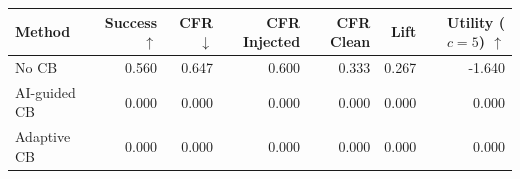 \begin{tabular}{lrrrrrr}
\toprule
Method & Success $\uparrow$ & CFR $\downarrow$ & CFR Injected & CFR Clean & Lift & Utility ($c=5$) $\uparrow$ \\
\midrule
No CB & 0.560 & 0.647 & 0.600 & 0.333 & 0.267 & -1.640 \\
AI-guided CB & 0.000 & 0.000 & 0.000 & 0.000 & 0.000 & 0.000 \\
Adaptive CB & 0.000 & 0.000 & 0.000 & 0.000 & 0.000 & 0.000 \\
\bottomrule
\end{tabular}
